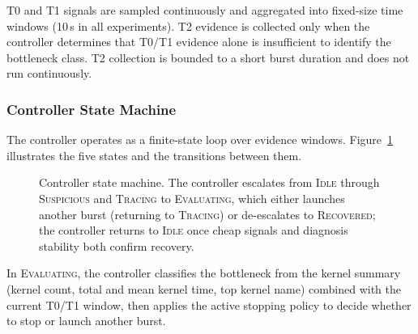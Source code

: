 T0 and T1 signals are sampled continuously and aggregated into fixed-size time windows (10\,s in all experiments). T2 evidence is collected only when the controller determines that T0/T1 evidence alone is insufficient to identify the bottleneck class. T2 collection is bounded to a short burst duration and does not run continuously.

\subsubsection{Controller State Machine}

The controller operates as a finite-state loop over evidence windows. Figure~\ref{fig:state-machine} illustrates the five states and the transitions between them.

\begin{figure}[t]
\centering
{}
\caption{Controller state machine. The controller escalates from \textsc{Idle} through \textsc{Suspicious} and \textsc{Tracing} to \textsc{Evaluating}, which either launches another burst (returning to \textsc{Tracing}) or de-escalates to \textsc{Recovered}; the controller returns to \textsc{Idle} once cheap signals and diagnosis stability both confirm recovery.}
\label{fig:state-machine}
\end{figure}

In \textsc{Evaluating}, the controller classifies the bottleneck from the kernel summary (kernel count, total and mean kernel time, top kernel name) combined with the current T0/T1 window, then applies the active stopping policy to decide whether to stop or launch another burst.


